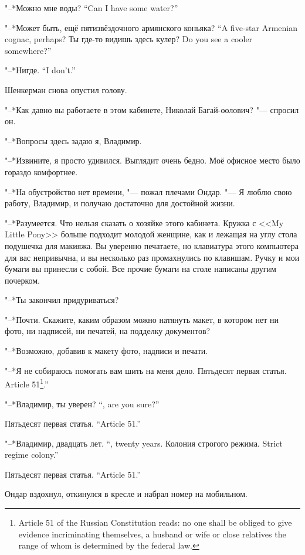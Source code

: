 {"--*Можно мне воды?}
{``Can I have some water?''}

{"--*Может быть, ещё пятизвёздочного армянского коньяка?}
{``A five-star Armenian cognac, perhaps?}
{Ты где-то видишь здесь кулер?}
{Do you see a cooler somewhere?''}

{"--*Нигде.}
{``I don't.''}

Шенкерман снова опустил голову.

"--*Как давно вы работаете в этом кабинете, Николай Багай-оолович? "--- спросил он.

"--*Вопросы здесь задаю я, Владимир.

"--*Извините, я просто удивился.
Выглядит очень бедно.
Моё офисное место было гораздо комфортнее.

"--*На обустройство нет времени, "--- пожал плечами Ондар.
"--- Я люблю свою работу, Владимир, и получаю достаточно для достойной жизни.

"--*Разумеется.
Что нельзя сказать о хозяйке этого кабинета.
Кружка с <<My Little Pony>> больше подходит молодой женщине, как и лежащая на углу стола подушечка для макияжа.
Вы уверенно печатаете, но клавиатура этого компьютера для вас непривычна, и вы несколько раз промахнулись по клавишам.
Ручку и мои бумаги вы принесли с собой.
Все прочие бумаги на столе написаны другим почерком.

"--*Ты закончил придуриваться?

"--*Почти.
Скажите, каким образом можно натянуть макет, в котором нет ни фото, ни надписей, ни печатей, на подделку документов?

"--*Возможно, добавив к макету фото, надписи и печати.

"--*Я не собираюсь помогать вам шить на меня дело.
{Пятьдесят первая статья.}
{Article 51\footnote{Article 51 of the Russian Constitution reads: no one shall be obliged to give evidence incriminating themselves, a husband or wife or close relatives the range of whom is determined by the federal law.}.''}

{"--*Владимир, ты уверен?}
{``\Vladimir, are you sure?''}

{Пятьдесят первая статья.}
{``Article 51.''}

{"--*Владимир, двадцать лет.}
{``\Vladimir, twenty years.}
{Колония строгого режима.}
{Strict regime colony.''}

{Пятьдесят первая статья.}
{``Article 51.''}

Ондар вздохнул, откинулся в кресле и набрал номер на мобильном.

